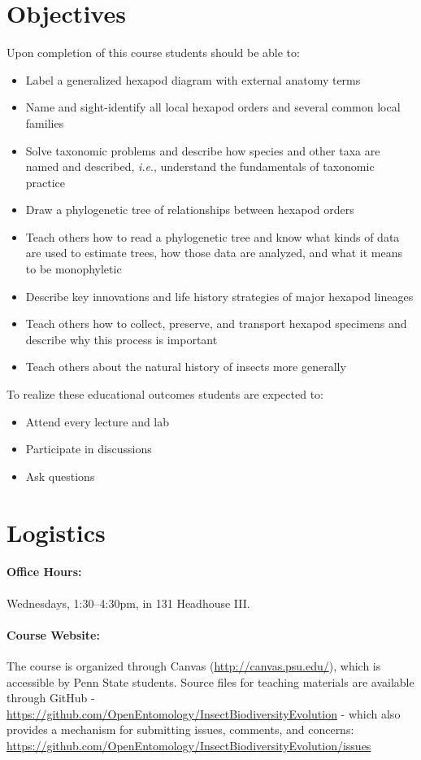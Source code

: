 \documentclass[11pt]{article}
\begin{document}
\section*{Objectives} 
Upon completion of this course students should be able to:
\begin{itemize}
\item Label a generalized hexapod diagram with external anatomy terms
\item Name and sight-identify all local hexapod orders and several common local families
\item Solve taxonomic problems and describe how species and other taxa are named and described, \textit{i.e}., understand the fundamentals of taxonomic practice
\item Draw a phylogenetic tree of relationships between hexapod orders
\item Teach others how to read a phylogenetic tree and know what kinds of data are used to estimate trees, how those data are analyzed, and what it means to be monophyletic
\item Describe key innovations and life history strategies of major hexapod lineages
\item Teach others how to collect, preserve, and transport hexapod specimens and describe why this process is important
\item Teach others about the natural history of insects more generally
\end{itemize} 

\noindent To realize these educational outcomes students are expected to:
\begin{itemize}
\item Attend every lecture and lab
\item Participate in discussions
\item Ask questions
\end{itemize}

\section*{Logistics} 
\paragraph{Office Hours:} Wednesdays, 1:30--4:30pm, in 131 Headhouse III.

\paragraph{Course Website:} The course is organized through Canvas (\url{http://canvas.psu.edu/}), which is accessible by Penn State students. Source files for teaching materials are available through GitHub - \url{https://github.com/OpenEntomology/InsectBiodiversityEvolution} - which also provides a mechanism for submitting issues, comments, and concerns:  \url{https://github.com/OpenEntomology/InsectBiodiversityEvolution/issues} 
\end{document}
